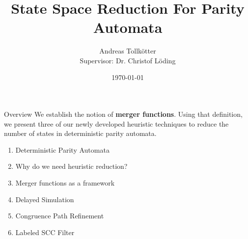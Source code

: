 \documentclass[xcolor=dvipsnames]{beamer}
\title{State Space Reduction For Parity Automata}
\author[Andreas Tollkötter]{Andreas Tollkötter\\{\small Supervisor: Dr. Christof Löding}}
\date{\today}
\theoremstyle{plain}
\theoremstyle{definition}
\theoremstyle{remark}
\let\emph\textbf
\begin{document}
{
\frame{\titlepage}
}

\begin{frame}{Overview}
We establish the notion of \emph{merger functions}. Using that definition, we present three of our newly developed heuristic techniques to reduce the number of states in deterministic parity automata. 

\vspace{.5cm}
\pause

\begin{enumerate}
	\item Deterministic Parity Automata
	\item Why do we need heuristic reduction?
	\item Merger functions as a framework
	\item Delayed Simulation
	\item Congruence Path Refinement
	\item Labeled SCC Filter
\end{enumerate}
\end{frame}





\begin{frame}[allowframebreaks]
\nocite{*}


\end{frame}
\end{document}

